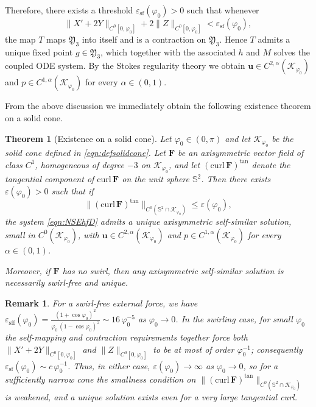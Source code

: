 \documentclass{amsart}
\newtheorem{theorem}{Theorem}[section]
\newtheorem{remark}{Remark}[section]
\newcommand{\curl}{\mathrm{curl}}
\newcommand{\vp}{\varphi}
\newcommand{\Bu}{{\boldsymbol{u}}}
\newcommand{\BF}{{\boldsymbol{F}}}
\begin{document}
Therefore, there exists a threshold $\varepsilon_{\mathrm{sf}}(\varphi_0)>0$ such that whenever
\[
\|X'+2Y\|_{C^0[0,\varphi_0]} + 2\|Z\|_{C^0[0,\varphi_0]} < \varepsilon_{\mathrm{sf}}(\varphi_0),
\]
the map $T$ maps $\mathfrak{Y}_3$ into itself and is a contraction on $\mathfrak{Y}_3$.
Hence $T$ admits a unique fixed point $g\in\mathfrak{Y}_3$, which together with the associated $h$ and $M$ solves the coupled ODE system.
By the Stokes regularity theory we obtain $\Bu\in C^{2,\alpha}(\mathcal{K}_{\varphi_0})$ and $p\in C^{1,\alpha}(\mathcal{K}_{\varphi_0})$ for every $\alpha\in(0,1)$.

From the above discussion we immediately obtain the following existence theorem on a solid cone.

\begin{theorem}[Existence on a solid cone]\label{thm:A-cone}
Let $\varphi_0\in(0,\pi)$ and let $\mathcal{K}_{\varphi_0}$ be the solid cone defined in \eqref{eqn:defsolidcone}.
Let $\BF$ be an axisymmetric vector field of class $C^1$, homogeneous of degree $-3$ on $\mathcal{K}_{\vp_0}$, and let $(\curl\,\BF)^{\tan}$ denote the tangential component of $\curl\,\BF$ on the unit sphere $\mathbb{S}^2$.
Then there exists $\varepsilon(\vp_0)>0$ such that if
\[
\|(\curl\,\BF)^{\tan}\|_{C^0(\mathbb{S}^2\cap\mathcal{K}_{\varphi_0})} \le \varepsilon(\varphi_0),
\]
the system \eqref{eqn:NSEhfD} admits a unique axisymmetric self-similar solution, small in $C^0(\mathcal{K}_{\varphi_0})$, with $\Bu\in C^{2,\alpha}(\mathcal{K}_{\varphi_0})$ and $p\in C^{1,\alpha}(\mathcal{K}_{\varphi_0})$ for every $\alpha\in(0,1)$.

Moreover, if $\BF$ has no swirl, then any axisymmetric self-similar solution is necessarily swirl-free and unique.
\end{theorem}

\begin{remark}
For a swirl-free external force, we have 
$\varepsilon_{\mathrm{sff}}(\varphi_0)=\frac{(1+\cos\varphi_0)^2}{\varphi_0\,(1-\cos\varphi_0)^{2}}\sim 16\,\varphi_0^{-5}$ as $\varphi_0\to0$.
In the swirling case, for small $\varphi_0$ the self-mapping and contraction requirements together force both $\|X'+2Y\|_{C^0[0,\vp_0]}$ and $\|Z\|_{C^0[0,\vp_0]}$ to be at most of order $\varphi_0^{-1}$; consequently $\varepsilon_{\mathrm{sf}}(\varphi_0)\sim c\,\varphi_0^{-1}$.
Thus, in either case, $\varepsilon(\varphi_0)\to\infty$ as $\varphi_0\to0$, so for a sufficiently narrow cone the smallness condition on $\|(\curl\,\BF)^{\tan}\|_{C^0(\mathbb{S}^2\cap\mathcal{K}_{\varphi_0})}$ is weakened,
and a unique solution exists even for a very large tangential curl.
\end{remark}
\end{document}
